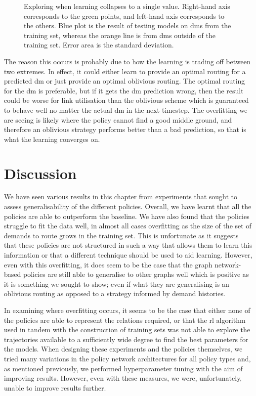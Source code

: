 \begin{figure}
    \centering
    \resizebox{\textwidth}{!}{}
    \caption{Exploring when learning collapses to a single value. Right-hand axis corresponds to the green points, and left-hand axis corresponds to the others. Blue plot is the result of testing models on \acp{dm} from the training set, whereas the orange line is from \acp{dm} outside of the training set. Error area is the standard deviation.}
    \label{fig:exp_fail}
\end{figure}

The reason this occurs is probably due to how the learning is trading off between two extremes. In effect, it could either learn to provide an optimal routing for a predicted \ac{dm} or just provide an optimal oblivious routing. The optimal routing for the \ac{dm} is preferable, but if it gets the \ac{dm} prediction wrong, then the result could be worse for link utilisation than the oblivious scheme which is guaranteed to behave well no matter the actual \ac{dm} in the next timestep. The overfitting we are seeing is likely where the policy cannot find a good middle ground, and therefore an oblivious strategy performs better than a bad prediction, so that is what the learning converges on.


\section{Discussion}
We have seen various results in this chapter from experiments that sought to assess generalisability of the different policies. Overall, we have learnt that all the policies are able to outperform the baseline. We have also found that the policies struggle to fit the data well, in almost all cases overfitting as the size of the set of demands to route grows in the training set. This is unfortunate as it suggests that these policies are not structured in such a way that allows them to learn this information or that a different technique should be used to aid learning. However, even with this overfitting, it does seem to be the case that the graph network-based policies are still able to generalise to other graphs well which is positive as it is something we sought to show; even if what they are generalising is an oblivious routing as opposed to a strategy informed by demand histories.

In examining where overfitting occurs, it seems to be the case that either none of the policies are able to represent the relations required, or that the \ac{rl} algorithm used in tandem with the construction of training sets was not able to explore the trajectories available to a sufficiently wide degree to find the best parameters for the models. When designing these experiments and the policies themselves, we tried many variations in the policy network architectures for all policy types and, as mentioned previously, we performed hyperparameter tuning with the aim of improving results. However, even with these measures, we were, unfortunately, unable to improve results further.

